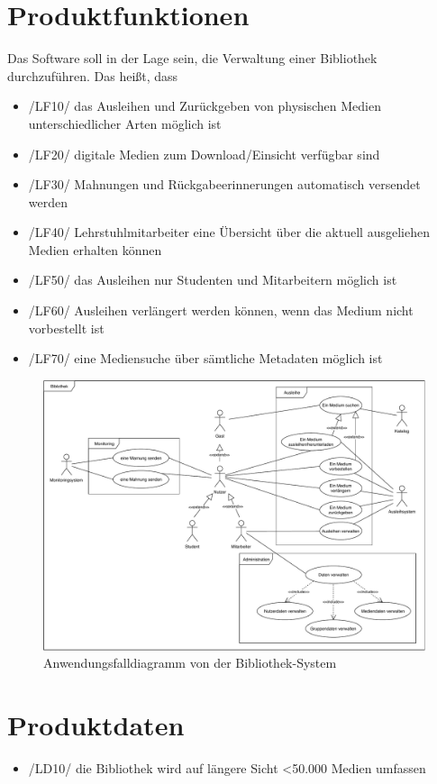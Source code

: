 \documentclass[12pt, a4paper]{article}
\begin{document}
\section{Produktfunktionen}
Das Software soll in der Lage sein, die Verwaltung einer Bibliothek durchzuführen. Das heißt, dass
\begin{itemize}
	\item /LF10/ das Ausleihen und Zurückgeben von physischen Medien unterschiedlicher Arten möglich ist
	\item /LF20/ digitale Medien zum Download/Einsicht verfügbar sind
	\item /LF30/ Mahnungen und Rückgabeerinnerungen automatisch versendet werden
	\item /LF40/ Lehrstuhlmitarbeiter eine Übersicht über die aktuell ausgeliehen Medien erhalten können
	\item /LF50/ das Ausleihen nur Studenten und Mitarbeitern möglich ist
	\item /LF60/ Ausleihen verlängert werden können, wenn das Medium nicht vorbestellt ist
	\item /LF70/ eine Mediensuche über sämtliche Metadaten möglich ist
\end{itemize}

\begin{figure}[h!]
	\includegraphics[width=1\linewidth]{diagrams/anwendungsfalldiagramm.pdf} 
	\caption{Anwendungsfalldiagramm von der Bibliothek-System}
	\label{fig:anwendungsfalldiagramm}
\end{figure}

\section{Produktdaten}
\begin{itemize}
	\item /LD10/ die Bibliothek wird auf längere Sicht <50.000 Medien umfassen
\end{itemize}
\end{document}
